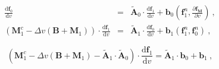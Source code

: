 \documentclass[review]{elsarticle}
\newcommand{\pdv}[2]{\frac{\partial{#1}}{\partial{#2}}}
\newcommand{\vect}[1]{\boldsymbol{#1}}
\newcommand{\matr}[1]{\mathbf{#1}}
\newcommand{\dI}{\text{d}}
\newcommand{\odv}[2]{\frac{\dI #1}{\dI #2}}
\newcommand{\ddv}[2]{\odv{#1}{#2}}
\newcommand{\vmag}{v}
\newcommand{\fM}{f_M}
\newcommand{\vfzero}{\vect{f}_0}
\newcommand{\fone}{\vect{f}_1}
\begin{document}
\begin{eqnarray}
  \ddv{\vfzero}{\vmag}  
  &=& 
  \matr{\tilde{A}}_0 \cdot \ddv{\fone}{\vmag}
  + \vect{b}_0\left(\fone^n, \pdv{\vect{\fM}}{\vmag}\right)~,  
  \label{eq:df0dv} \\
  \left( \matr{M}^c_1 
  - \Delta \vmag \left( \matr{B} + \matr{M}_1 \right) \right) 
  \cdot \ddv{\fone}{\vmag}  
  &=& 
  \matr{\tilde{A}}_1 \cdot \ddv{\vfzero}{\vmag}  
  + \vect{b}_1 \left( \fone^n, \vfzero^n \right)~, 
  \label{eq:df1dvdf0dv}
\end{eqnarray}

\begin{equation}
  \left( \matr{M}^c_1 
  - \Delta \vmag \left( \matr{B} + \matr{M}_1 \right) 
  - \matr{\tilde{A}}_1 \cdot \matr{\tilde{A}}_0 \right) 
  \cdot \ddv{\fone}{\vmag}  
  = 
  \matr{\tilde{A}}_1 
  \cdot \vect{b}_0 + \vect{b}_1~, 
  \label{eq:df1dv}
\end{equation}
\end{document}
